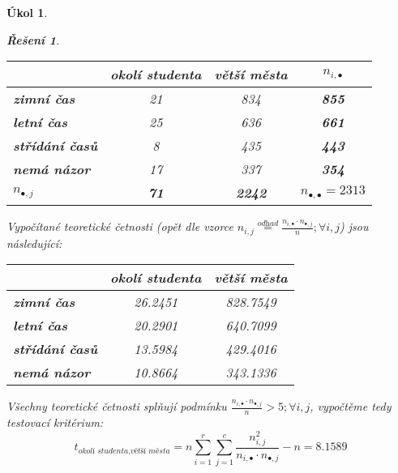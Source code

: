 \documentclass[11pt, a4paper]{article}
\theoremstyle{result}
\newtheorem*{result}{Řešení}
\newtheorem{task}{Úkol}
\begin{document}
\begin{task}
\begin{enumerate}[a)]
\begin{result}
            \begin{center}
                \begin{tabular}{ |l|c|c|c| }
                    \hline
                    & \textbf{okolí studenta} & \textbf{větší města} & \boldmath$n_{i, \bullet}$ \\
                    \hline
                    \textbf{zimní čas} & 21 & 834 & \textbf{855} \\
                    \hline
                    \textbf{letní čas} & 25 & 636 & \textbf{661} \\
                    \hline
                    \textbf{střídání časů} & 8 & 435 & \textbf{443} \\
                    \hline
                    \textbf{nemá názor} & 17 & 337 & \textbf{354} \\
                    \hline
                    \boldmath$n_{\bullet, j}$ & \textbf{71} & \textbf{2242} & \boldmath$n_{\bullet, \bullet} = 2313$ \\
                    \hline
                \end{tabular}
            \end{center}

            Vypočítané teoretické četnosti (opět dle vzorce $n_{i, j} \overset{\textit{odhad}}= \frac{n_{i, \bullet} \cdot n_{\bullet, j}}{n}; \forall i,j$) jsou následující:

            \begin{center}
                \begin{tabular}{ |l|c|c| }
                    \hline
                    & \textbf{okolí studenta} & \textbf{větší města} \\
                    \hline
                    \textbf{zimní čas} & 26.2451 & 828.7549 \\
                    \hline
                    \textbf{letní čas} & 20.2901 & 640.7099 \\
                    \hline
                    \textbf{střídání časů} & 13.5984 & 429.4016 \\
                    \hline
                    \textbf{nemá názor} & 10.8664 & 343.1336 \\
                    \hline
                \end{tabular}
            \end{center}

            Všechny teoretické četnosti splňují podmínku $\frac{n_{i, \bullet} \cdot n_{\bullet, j}}{n} > 5; \forall i,j$, vypočtěme tedy testovací kritérium:
            $$t_{\textit{okolí studenta}, \textit{větší města}} = n \sum_{i=1}^{r} \sum_{j=1}^{c} \frac{n_{i, j}^2}{n_{i, \bullet} \cdot n_{\bullet, j}} - n = 8.1589$$


\end{result}
\end{enumerate}
\end{task}
\end{document}
